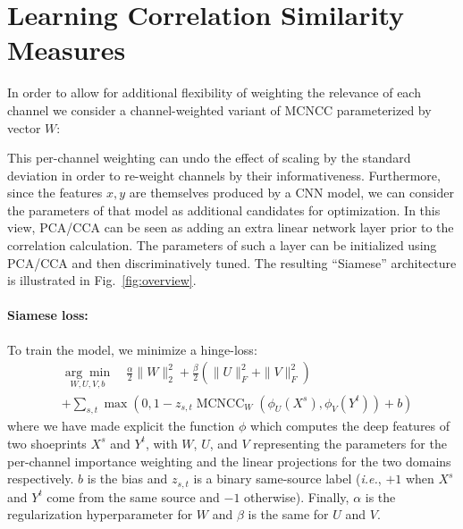 \documentclass[twocolumn]{svjour3}           %
\newcommand{\ie}{\emph{i.e.}}
\begin{document}
\section{Learning Correlation Similarity Measures}
\label{sec:learning}

In order to allow for additional flexibility of weighting the relevance of each
channel we consider a channel-weighted variant of MCNCC parameterized by vector
$W$:

This per-channel weighting can undo the effect of scaling by the standard
deviation in order to re-weight channels by their informativeness.
Furthermore, since the features $x,y$ are themselves produced by a CNN model,
we can consider the parameters of that model as additional candidates for
optimization.  In this view, PCA/CCA can be seen as adding an extra linear
network layer prior to the correlation calculation.  The parameters of such a
layer can be initialized using PCA/CCA and then discriminatively tuned. The
resulting ``Siamese'' architecture is illustrated in Fig.~\ref{fig:overview}.

\paragraph{Siamese loss:} To train the model, we minimize a hinge-loss:
\begin{align}
  &\underset{W,U,V,b}{\arg\min} \quad\frac{\alpha}{2}\|W\|_2^2
    + \frac{\beta}{2}\left( \|U\|_F^2 + \|V\|_F^2 \right) \\\nonumber
  &+ \sum_{s,t} \operatorname{max}\left( 0,
    1 - z_{s,t}\operatorname{MCNCC}_{W}(\phi_{U}(X^s),\phi_{V}(Y^t)) + b
               \right)
\end{align}
where we have made explicit the function $\phi$ which computes the deep
features of two shoeprints $X^s$ and $Y^t$, with $W$, $U$, and $V$ representing
the parameters for the per-channel importance weighting and the linear
projections for the two domains respectively.
$b$ is the bias and $z_{s,t}$ is a binary same-source label (\ie, $+1$ when $X^s$ and
$Y^t$ come from the same source and $-1$ otherwise).
Finally, $\alpha$ is the regularization hyperparameter for $W$ and $\beta$ is
the same for $U$ and $V$.
\end{document}
